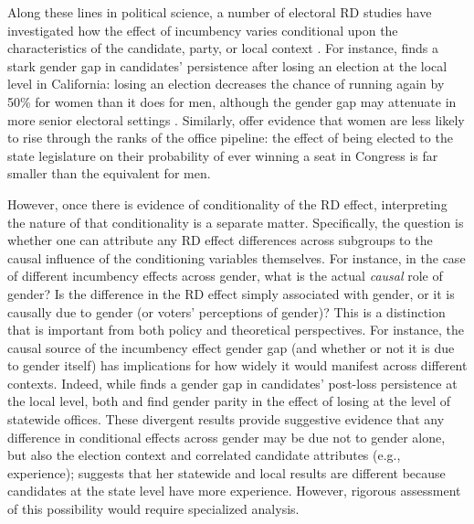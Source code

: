 \documentclass[12pt]{article}
\begin{document}
Along these lines in political science, a number of electoral RD studies have investigated how the effect of incumbency varies conditional upon the characteristics of the candidate, party, or local context \citep{eggers2017, lopes2017, nunez2018, de2018, wasserman2018, bernhard2021, olson2020, wasserman2021}. For instance, \citet{wasserman2018} finds a stark gender gap in candidates' persistence after losing an election at the local level in California: losing an election decreases the chance of running again by 50\% for women than it does for men, although the gender gap may attenuate in more senior electoral settings \citep{wasserman2021,bernhard2021}. Similarly, \citet{brown2019} offer evidence that women are less likely to rise through the ranks of the office pipeline: the effect of being elected to the state legislature on their probability of ever winning a seat in Congress is far smaller than the equivalent for men.

However, once there is evidence of conditionality of the RD effect, interpreting the nature of that conditionality is a separate matter. Specifically, the question is whether one can attribute any RD effect differences across subgroups to the causal influence of the conditioning variables themselves. For instance, in the case of different incumbency effects across gender, what is the actual \emph{causal} role of gender? Is the difference in the RD effect simply associated with gender, or it is causally due to gender (or voters' perceptions of gender)? This is a distinction that is important from both policy and theoretical perspectives. For instance, the causal source of the incumbency effect gender gap (and whether or not it is due to gender itself) has implications for  how widely it would manifest across different contexts. Indeed, while \citet{wasserman2018} finds a gender gap in candidates' post-loss persistence at the local level, both \citet{bernhard2021} and \citet{wasserman2021} find gender parity in the effect of losing at the level of statewide offices. These divergent results provide suggestive evidence that any difference in conditional effects across gender may be due not to gender alone, but also the election context and correlated candidate attributes (e.g., experience); \citet{wasserman2021} suggests that her statewide and local results are different because candidates at the state level have more experience. However, rigorous assessment of this possibility would require specialized analysis.
\end{document}

